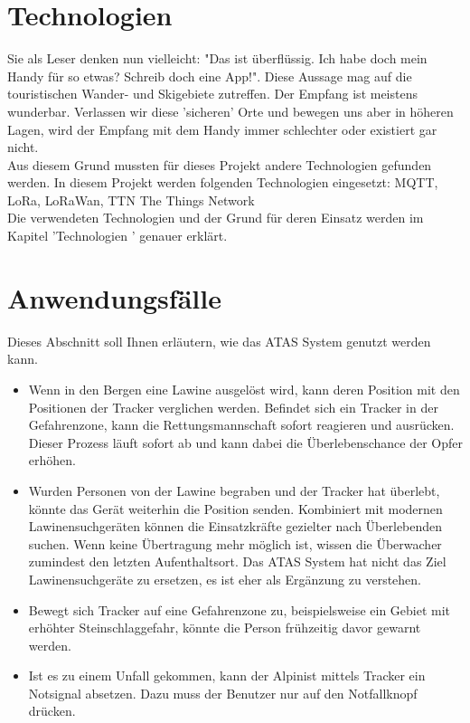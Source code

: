 \documentclass[11pt,english,german]{report}
\theoremstyle{definition}
\begin{document}
\section{Technologien}
Sie als Leser denken nun vielleicht: "Das ist überflüssig. Ich habe doch mein Handy für so etwas? Schreib doch eine App!". Diese Aussage mag auf die touristischen Wander- und Skigebiete zutreffen. Der Empfang ist meistens wunderbar. Verlassen wir diese 'sicheren' Orte und bewegen uns aber in höheren Lagen, wird der Empfang mit dem Handy immer schlechter oder existiert gar nicht. \bigskip \\
Aus diesem Grund mussten für dieses Projekt andere Technologien gefunden werden. In diesem Projekt werden folgenden Technologien eingesetzt:
\gls{MQTT}, \gls{LoRa}, \gls{LoRaWan}, \gls{TTN} The Things Network\bigskip \\
Die verwendeten Technologien und der Grund für deren Einsatz werden im Kapitel 'Technologien ' genauer erklärt.

\section{Anwendungsfälle}
Dieses Abschnitt soll Ihnen erläutern, wie das ATAS System genutzt werden kann.
\begin{itemize}
	\item 
	Wenn in den Bergen eine Lawine ausgelöst wird, kann deren Position mit den Positionen der Tracker verglichen werden. Befindet sich ein Tracker in der Gefahrenzone, kann die Rettungsmannschaft sofort reagieren und ausrücken. Dieser Prozess läuft sofort ab und kann dabei die Überlebenschance der Opfer erhöhen. 
	\item 
	Wurden Personen von der Lawine begraben und der Tracker hat überlebt, könnte das Gerät weiterhin die Position senden. Kombiniert mit modernen Lawinensuchgeräten können die Einsatzkräfte gezielter nach Überlebenden suchen. Wenn keine Übertragung mehr möglich ist, wissen die Überwacher zumindest den letzten Aufenthaltsort. Das ATAS System hat nicht das Ziel Lawinensuchgeräte zu ersetzen, es ist eher als Ergänzung zu verstehen. 
	\item 
	Bewegt sich Tracker auf eine Gefahrenzone zu, beispielsweise ein Gebiet mit erhöhter Steinschlaggefahr, könnte die Person frühzeitig davor gewarnt werden. 
	\item 
	Ist es zu einem Unfall gekommen, kann der Alpinist mittels Tracker ein Notsignal absetzen. Dazu muss der Benutzer nur auf den Notfallknopf drücken.
\end{itemize}
\end{document}
